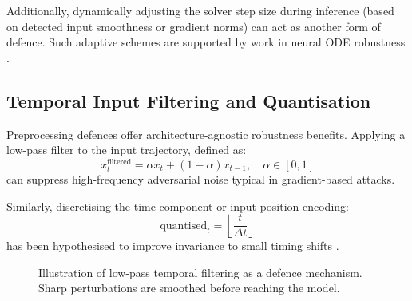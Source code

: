 Additionally, dynamically adjusting the solver step size during inference (based on detected input smoothness or gradient norms) can act as another form of defence. Such adaptive schemes are supported by work in neural ODE robustness \cite{dupont2019augmented, finlay2020trainable}.

\subsection*{Temporal Input Filtering and Quantisation}

Preprocessing defences offer architecture-agnostic robustness benefits. Applying a low-pass filter to the input trajectory, defined as:
\begin{equation}
x_t^{\text{filtered}} = \alpha x_t + (1 - \alpha) x_{t-1}, \quad \alpha \in [0, 1]
\end{equation}
can suppress high-frequency adversarial noise typical in gradient-based attacks.

Similarly, discretising the time component or input position encoding:
\begin{equation}
\text{quantised}_t = \left\lfloor \frac{t}{\Delta t} \right\rfloor
\end{equation}
has been hypothesised to improve invariance to small timing shifts \cite{wang2018adversarial}.


\begin{figure}[H]
    \centering
    \caption{Illustration of low-pass temporal filtering as a defence mechanism. Sharp perturbations are smoothed before reaching the model.}
    \label{fig:temporal_filter}
    \end{figure}

